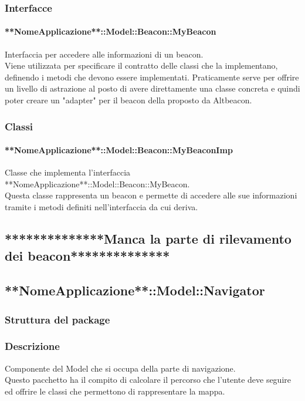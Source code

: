 \documentclass[../SpecificaTecnica.tex]{subfiles}
\begin{document}
		\subsubsection{Interfacce}
			\paragraph{**NomeApplicazione**::Model::Beacon::MyBeacon}
				Interfaccia per accedere alle informazioni di un beacon. \\ 
				Viene utilizzata per specificare il contratto delle classi che la implementano, definendo i metodi che devono essere implementati. Praticamente serve per offrire un livello di astrazione al posto di avere direttamente una classe concreta e quindi poter creare un "adapter" per il beacon della proposto da Altbeacon.
		\subsubsection{Classi}
			\paragraph{**NomeApplicazione**::Model::Beacon::MyBeaconImp}
				Classe che implementa l'interfaccia **NomeApplicazione**::Model::Beacon::MyBeacon. \\
				Questa classe rappresenta un beacon e permette di accedere alle sue informazioni tramite i metodi definiti nell'interfaccia da cui deriva.
	\subsection{**************Manca la parte di rilevamento dei beacon**************}
	\subsection{**NomeApplicazione**::Model::Navigator}
		\subsubsection{Struttura del package}
		\subsubsection{Descrizione}
			Componente del Model che si occupa della parte di navigazione. \\
			Questo pacchetto ha il compito di calcolare il percorso che l'utente deve seguire ed offrire le classi che permettono di rappresentare la mappa.
\end{document}
